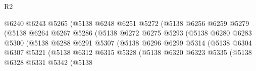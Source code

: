 \begin{lexlean}{R2}
\begin{coremodule}
                                      @6240
                                      @6243
                                      @5265
                                      (@5138
                                        @6248
                                        @6251
                                        @5272
                                        (@5138
                                          @6256
                                          @6259
                                          @5279
                                          (@5138
                                            @6264
                                            @6267
                                            @5286
                                            (@5138
                                              @6272
                                              @6275
                                              @5293
                                              (@5138
                                                @6280
                                                @6283
                                                @5300
                                                (@5138
                                                  @6288
                                                  @6291
                                                  @5307
                                                  (@5138
                                                    @6296
                                                    @6299
                                                    @5314
                                                    (@5138
                                                      @6304
                                                      @6307
                                                      @5321
                                                      (@5138
                                                        @6312
                                                        @6315
                                                        @5328
                                                        (@5138
                                                          @6320
                                                          @6323
                                                          @5335
                                                          (@5138
                                                            @6328
                                                            @6331
                                                            @5342
                                                            (@5138

\end{coremodule}
\end{lexlean}
